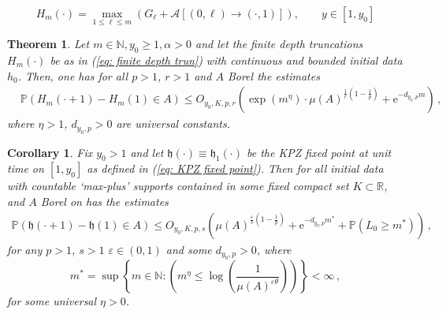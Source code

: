 \documentclass[10pt,a4paper]{amsart}
\newtheorem{theorem}{Theorem}
\newtheorem{corollary}{Corollary}
\newcommand{\N}{\ensuremath{\mathbb{N}}}
\newcommand{\PP}{\ensuremath{\mathbb{P}}}
\newcommand{\R}{\ensuremath{\mathbb{R}}}
\begin{document}
\begin{equation}\label{eq: finite depth trun}
H_m(\cdot) = \displaystyle\max_{1 \le \ell \le m}(G_\ell + \mathcal{A}[(0,\ell)\to (\cdot ,1)]), \qquad y\in [1,y_0]
\end{equation}

\begin{theorem}\label{thm: finite depth KPZ bounds}
    Let $m\in \N, y_0 \ge 1, \alpha > 0$ and let the finite depth truncations $H_m(\cdot)$ be as in (\ref{eq: finite depth trun}) with continuous and bounded initial data $h_0$. Then, one has for all $p>1$, $r>1$ and $A$ Borel the estimates
\begin{equation*}
    \begin{array}{cc}
        &\PP \left( H_m(\cdot + 1)-H_m(1)\in A \right)\le O_{y_0, K, p,r}\left(\exp(m^\eta)\cdot \mu(A)^{\frac{1}{r}(1-\frac{1}{p})}+ \mathrm{e}^{-d_{y_0, p} m}\right)\,,
    \end{array}
\end{equation*}
where $\eta > 1$, $d_{y_0, p}>0$ are universal constants.
\end{theorem}

\begin{corollary}\label{cor: KPZ log comparison BM}
 Fix $y_0>1$ and let $\mathfrak{h}(\cdot)\equiv \mathfrak{h}_1(\cdot)$ be the KPZ fixed point at unit time on $[1,y_0]$ as defined in (\ref{eq: KPZ fixed point}). Then for all initial data with countable `max-plus' supports contained in some fixed compact set $K\subset \R$, and $A$ Borel on has the estimates 
\begin{equation*}
\begin{array}{cc}
     \PP(\mathfrak{h}(\cdot + 1)-\mathfrak{h}(1)\in A) \le O_{y_0, K, p,s} \left(\mu(A)^{\frac{\varepsilon}{s}(1-\frac{1}{p})}+ \mathrm{e}^{-d_{y_0, p}m^*} +  \PP(L_0\geq m^*)\right)\,,
\end{array}
\end{equation*}
for any $p>1$, $s>1$  $\varepsilon \in (0,1)$ and some $d_{y_0, p}> 0$, where
\begin{equation*}
m^* =  \displaystyle \sup \left\{m\in \mathbb{N} :  \left(m^\eta \le \log \left(\frac{1}{ \mu(A)^{\varepsilon\theta}}\right)\right)\right\}<\infty\,,
\end{equation*}
for some universal $\eta > 0$.
\end{corollary}
\end{document}
